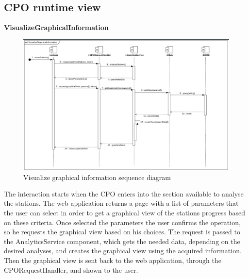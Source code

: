 \subsection{CPO runtime view}
\textbf{VisualizeGraphicalInformation}\\
\begin{figure}[H]
    \centering
    \includegraphics[trim={0 0cm 0 0.15cm},clip,width=1\textwidth]{Images/cp2/runtime/VisualizeGraphicalInformation.png}
    \caption{Visualize graphical information sequence diagram}
\end{figure}
The interaction starts when the CPO enters into the section available to analyse the stations. The web application returns a page with a list of parameters that the user can select in order to get a graphical view of the stations progress based on these criteria. Once selected the parameters the user confirms the operation, so he requests the graphical view based on his choices. The request is passed to the AnalyticsService component, which gets the needed data, depending on the desired analyses, and creates the graphical view using the acquired information. Then the graphical view is sent back to the web application, through the CPORequestHandler, and shown to the user.   


